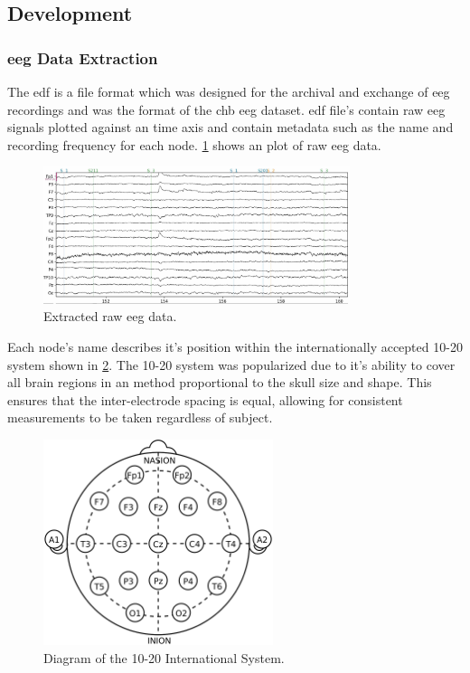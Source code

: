 \documentclass[12pt]{article}
\begin{document}
\subsection{Development}


\subsubsection{\acrfull{eeg} Data Extraction}

The \acrfull{edf} \cite{kemp1992simple} is a file format which was designed for the archival and exchange of \acrshort{eeg} recordings \cite{kemp2013european} and was the format of the \acrshort{chb} \acrshort{eeg} dataset. \acrshort{edf} file's contain raw \acrshort{eeg} signals plotted against an time axis and contain metadata such as the name and recording frequency for each node. \ref{fig:eegPlot} shows an plot of raw \acrshort{eeg} data. 

\begin{figure}[H]
\includegraphics[width=0.8\textwidth]{eeg_raw_continuous}
\centering
\caption{Extracted raw \acrshort{eeg} data. \protect\cite{neuraldatascience2024}}
\label{fig:eegPlot}
\end{figure}

Each node's name describes it's position within the internationally accepted 10-20 system shown in \ref{fig:10-20}. The 10-20 system was popularized due to it's ability to cover all brain regions in an method proportional to the skull size and shape. This ensures that the inter-electrode spacing is equal, allowing for consistent measurements to be taken regardless of subject. \cite{morley201610}



\begin{figure}[H]
\includegraphics[width=0.6\textwidth]{10-20}
\centering
\caption{Diagram of the 10-20 International System. \protect\cite{tomaton1242010}}
\label{fig:10-20}
\end{figure}
\end{document}
